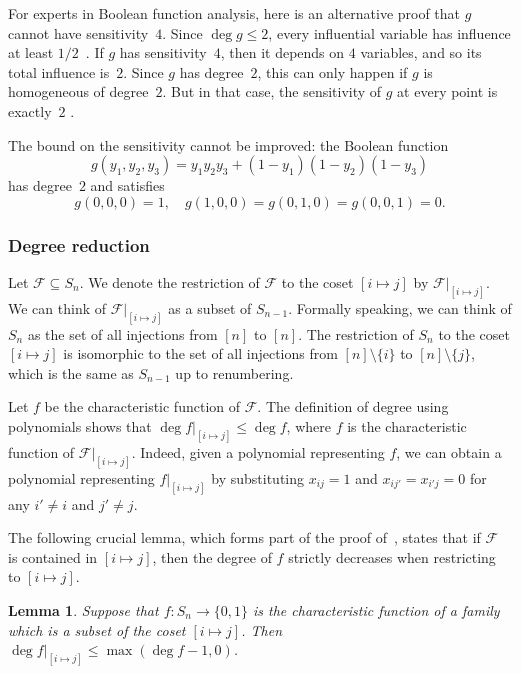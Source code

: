 \documentclass[10pt,a4paper]{amsart}
\newtheorem{lemma}[theorem]{Lemma}
\theoremstyle{definition}
\providecommand{\coset}[2]{[#1 \mapsto #2]}
\begin{document}
For experts in Boolean function analysis, here is an alternative proof that $g$ cannot have sensitivity~$4$. Since $\deg g \leq 2$, every influential variable has influence at least $1/2$~\cite[Proposition 3.6]{ODonnell}. If $g$ has sensitivity~$4$, then it depends on $4$ variables, and so its total influence is~$2$. Since $g$ has degree~$2$, this can only happen if $g$ is homogeneous of degree~$2$. But in that case, the sensitivity of $g$ at every point is exactly~$2$ \cite[Proposition 3.7]{FHKL}.

The bound on the sensitivity cannot be improved: the Boolean function
\[
 g(y_1,y_2,y_3) = y_1 y_2 y_3 + (1 - y_1) (1 - y_2) (1 - y_3)
\]
has degree~$2$ and satisfies
\[
 g(0,0,0) = 1, \quad
 g(1,0,0) = g(0,1,0) = g(0,0,1) = 0.
\]

\subsubsection{Degree reduction} \label{sec:degree-reduction-sym}

Let $\mathcal{F} \subseteq S_n$. We denote the restriction of $\mathcal{F}$ to the coset $\coset{i}{j}$ by $\mathcal{F}|_{\coset{i}{j}}$. We can think of $\mathcal{F}|_{\coset{i}{j}}$ as a subset of $S_{n-1}$. Formally speaking, we can think of $S_n$ as the set of all injections from $[n]$ to $[n]$. The restriction of $S_n$ to the coset $\coset{i}{j}$ is isomorphic to the set of all injections from $[n] \setminus \{i\}$ to $[n] \setminus \{j\}$, which is the same as $S_{n-1}$ up to renumbering.

Let $f$ be the characteristic function of $\mathcal{F}$. The definition of degree using polynomials shows that $\deg f|_{\coset{i}{j}} \leq \deg f$, where $f$ is the characteristic function of $\mathcal{F}|_{\coset{i}{j}}$. Indeed, given a polynomial representing $f$, we can obtain a polynomial representing $f|_{\coset{i}{j}}$ by substituting $x_{ij} = 1$ and $x_{ij'} = x_{i'j} = 0$ for any $i' \neq i$ and $j' \neq j$.

The following crucial lemma, which forms part of the proof of~\cite[Lemma 5.7]{DFLLV}, states that if $\mathcal{F}$ is contained in $\coset{i}{j}$, then the degree of $f$ strictly decreases when restricting to $\coset{i}{j}$.

\begin{lemma} \label{lem:degree-reduction-sym}
Suppose that $f\colon S_n \to \{0,1\}$ is the characteristic function of a family which is a subset of the coset $\coset{i}{j}$. Then $\deg f|_{\coset{i}{j}} \leq \max( \deg f - 1, 0 )$.
\end{lemma}
\end{document}

